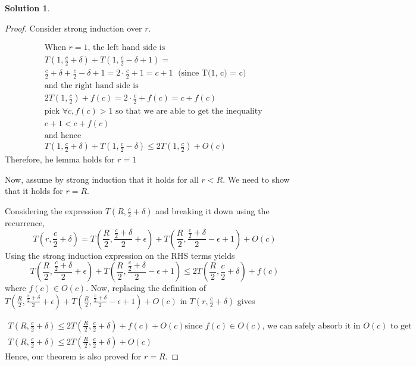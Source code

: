 \documentclass{article}
\theoremstyle{definition}
\newtheorem*{solution}{Solution}
\begin{document}
\begin{solution}
\begin{proof}
Consider strong induction over $r$.


\begin{gather*}
\text{When $r = 1$, the left hand side is } \\
T \left(1, \frac{c}{2} + \delta\right) + T \left(1, \frac{c}{2} - \delta + 1 \right) =  \\
\frac{c}{2} + \delta + \frac{c}{2} - \delta + 1= 2 \cdot \frac{c}{2} + 1= c + 1 \; \text{ (since T(1, c) = c)} \\
\text{and the right hand side is} \\
2T \left(1, \frac{c}{2} \right) + f(c) = 2 \cdot \frac c 2 + f(c) = c + f(c) \\
\text{pick $\forall c, f(c) > 1$ so that we are able to get the inequality } \\
c + 1 < c + f(c) \\
\text{and hence} \\
T \left(1, \frac{c}{2} + \delta\right) + T \left(1, \frac{c}{2} - \delta \right) \leq 2T \left(1, \frac{c}{2} \right) + O(c)
\end{gather*}
Therefore, he lemma holds for $r = 1$


Now, assume by strong induction that it holds for all $r < R$. We need to show that it holds for $r = R$.

Considering the expression $T \left(R, \frac{c}{2} + \delta \right)$ and breaking it down using the recurrence, 
$$
T \left(r, \frac{c}{2} + \delta \right) = T\left(\frac{R}{2}, \frac{\frac{c}{2} + \delta}{2} + \epsilon \right) + T\left(\frac{R}{2}, \frac{\frac{c}{2} + \delta}{2} - \epsilon + 1 \right) + O(c)
$$
Using the strong induction expression on the RHS terms yields
$$
T\left(\frac{R}{2}, \frac{\frac{c}{2} + \delta}{2} + \epsilon \right) + 
T\left(\frac{R}{2}, \frac{\frac{c}{2} + \delta}{2} - \epsilon + 1 \right) \leq 2T\left(\frac{R}{2}, \frac{c}{2} + \delta \right) + f(c)
$$
where $f(c) \in O(c)$. 
Now, replacing the definition of
$ T\left(\frac{R}{2}, \frac{\frac{c}{2} + \delta}{2} + \epsilon \right) + T\left(\frac{R}{2}, \frac{\frac{c}{2} + \delta}{2} - \epsilon + 1 \right) + O(c) $
in $T \left(r, \frac{c}{2} + \delta \right)$ gives

\begin{gather*}
T \left(R, \frac{c}{2} + \delta \right)  \leq 2T\left(\frac{R}{2}, \frac{c}{2} + \delta \right) + f(c) + O(c)
\text{since $f(c) \in O(c)$, we can safely absorb it in $O(c)$ to get} \\
T \left(R, \frac{c}{2} + \delta \right)  \leq 2T\left(\frac{R}{2}, \frac{c}{2} + \delta \right) + O(c)
\end{gather*}
Hence, our theorem is also proved for $r = R$.
\end{proof}


\end{solution}
\end{document}
